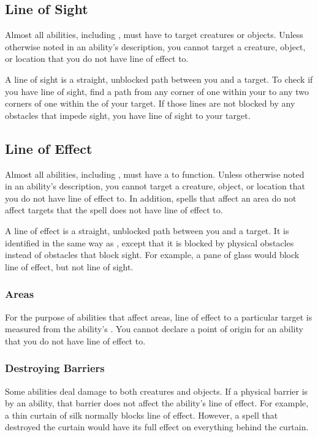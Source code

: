     \subsection{Line of Sight}\label{Line of Sight}
        Almost all abilities, including , must have  to target creatures or objects.
        Unless otherwise noted in an ability's description, you cannot target a creature, object, or location that you do not have line of effect to.

        A line of sight is a straight, unblocked path between you and a target.
        To check if you have line of sight, find a path from any corner of one  within your  to any two corners of one  within the  of your target.
        If those lines are not blocked by any obstacles that impede sight, you have line of sight to your target.

    \subsection{Line of Effect}\label{Line of Effect}

        Almost all abilities, including , must have a  to function.
        Unless otherwise noted in an ability's description, you cannot target a creature, object, or location that you do not have line of effect to.
        In addition, spells that affect an area do not affect targets that the spell does not have line of effect to.

        A line of effect is a straight, unblocked path between you and a target.
        It is identified in the same way as , except that it is blocked by physical obstacles instead of obstacles that block sight.
        For example, a pane of glass would block line of effect, but not line of sight.

        \subsubsection{Areas}
            For the purpose of abilities that affect areas, line of effect to a particular target is measured from the ability's .
            You cannot declare a point of origin for an ability that you do not have line of effect to.

        \subsubsection{Destroying Barriers}\label{Destroying Barriers}
            Some abilities deal damage to both creatures and objects.
            If a physical barrier is  by an ability, that barrier does not affect the ability's line of effect.
            For example, a thin curtain of silk normally blocks line of effect.
            However, a spell that destroyed the curtain would have its full effect on everything behind the curtain.

